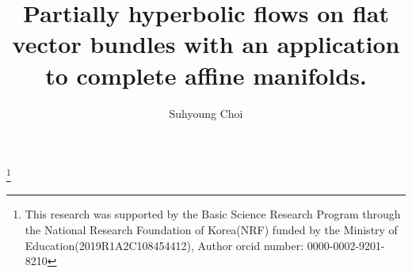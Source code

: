 \newcommand\cG{{\mathcal{G}}}
\newcommand\cg{{\mathsf{g}}}
\newcommand\logt{{\log_{\frac{1}{t}}}}
\newcommand\Logt{{{\mathrm{Log}}_{\frac{1}{t}}}}
\newcommand\trop{{\mathrm{trop}}}
\newcommand\Dis{{\mathcal{D}}}
\newcommand\ssb{{\mathsf{b}}}
\newcommand\mx{{\mathrm{max}}}
\newcommand\cwl{{\mathrm{cwl}}}
\newcommand\Ss{{\mathbb{S}}}
\newcommand\supp{{\mathrm{supp}}}






\newcommand{\vv}{\mathbf{v}}
\newcommand{\vw}{\mathbf{w}}
\newcommand{\va}{\mathbf{a}}
\newcommand{\vb}{\mathbf{b}}
\newcommand{\vc}{\mathbf{c}}
\newcommand{\vn}{\mathbf{n}}
\newcommand{\vp}{\mathbf{p}}
\newcommand{\vx}{\mathbf{x}}
\newcommand{\vu}{\mathbf{u}}
\newcommand{\vy}{\mathbf{y}}
\newcommand{\be}{\mathbf{e}}
\newcommand{\bp}{\mathbf{p}}
\newcommand{\CH}{\mathcal{CH}}
\newcommand{\rec}{\mathrm{rec}}
\newcommand{\tbV}{\widetilde{\mathbf{V}}}
\newcommand{\bg}{\mathsf{g}}
\newcommand{\Uu}{\mathbf{U}} 
\newcommand{\Uc}{\mathbf{UC}}

\newcommand{\llrrbracket}[1]{%
	\left[\mkern-2mu\left[#1\right]\mkern-2mu\right]}
\newcommand{\llrrparen}[1]{%
	\left(\mkern-4mu\left(#1\right)\mkern-4mu\right)}
\newcommand{\llrrV}[1]{%
	\left|\mkern-2mu\left|#1\right|\mkern-2mu\right|}

\newcommand{\Paren}[1]{%
	\left(#1\right)}

\newcommand*{\Scale}[2][4]{\scalebox{#1}{$#2$}}%



\newcommand\vol{{\mathsf{vol}}}
\newcommand\algvol{{\mathsf{algvol}}}




\setcounter{tocdepth}{3} %


	
	\title[Partially hyperbolic flows]{
		Partially hyperbolic flows on flat vector bundles with 
an application to complete affine manifolds.} 

	\author[S. Choi]{Suhyoung Choi}
	\thanks{This research was supported by the Basic Science Research Program through the National Research Foundation
		of Korea(NRF) funded by the Ministry of Education(2019R1A2C108454412), 
		Author orcid number: 0000-0002-9201-8210}
	\address{Department of Mathematical Sciences \\ KAIST \\Daejeon 34141, South Korea}
	
